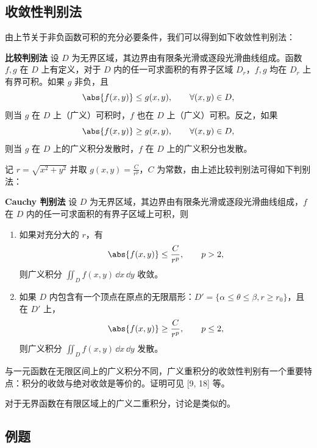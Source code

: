 \subsection{收敛性判别法}

由上节关于非负函数可积的充分必要条件，我们可以得到如下收敛性判别法：

\textbf{比较判别法}
设 $D$ 为无界区域，其边界由有限条光滑或逐段光滑曲线组成。函数 $f,g$ 在 $D$ 上有定义，对于 $D$ 内的任一可求面积的有界子区域 $D_r$，$f,g$ 均在 $D_r$ 上有界可积。如果 $g$ 非负，且
\[
  \abs{f(x,y)}\le g(x,y),\qquad\forall(x,y)\in D,
\]
则当 $g$ 在 $D$ 上（广义）可积时，$f$ 也在 $D$ 上（广义）可积。反之，如果
\[
  \abs{f(x,y)}\ge g(x,y),\qquad\forall(x,y)\in D,
\]
则当 $g$ 在 $D$ 上的广义积分发散时，$f$ 在 $D$ 上的广义积分也发散。

记 $r=\sqrt{x^2+y^2}$ 并取 $g(x,y)=\frac C{r^p}$，$C$ 为常数，由上述比较判别法可得如下判别法：

\textbf{Cauchy 判别法}
设 $D$ 为无界区域，其边界由有限条光滑或逐段光滑曲线组成，$f$ 在 $D$ 内的任一可求面积的有界子区域上可积，则
\begin{enumerate}[label=(\arabic*)]
  \item 如果对充分大的 $r$，有
  \[
    \abs{f(x,y)}\le\frac C{r^p},\qquad p>2,
  \]
  则广义积分 $\iint_Df(x,y)\,\dd x\,\dd y$ 收敛。
  \item 如果 $D$ 内包含有一个顶点在原点的无限扇形：$D'=\{\alpha\le\theta\le\beta,r\ge r_0\}$，且在 $D'$ 上，
  \[
    \abs{f(x,y)}\ge\frac C{r^p},\qquad p\le2,
  \]
  则广义积分 $\iint_Df(x,y)\,\dd x\,\dd y$ 发散。
\end{enumerate}

与一元函数在无限区间上的广义积分不同，广义重积分的收敛性判别有一个重要特点：积分的收敛与绝对收敛是等价的。证明可见 [9, 18] 等。

对于无界函数在有限区域上的广义二重积分，讨论是类似的。

\subsection{例题}

